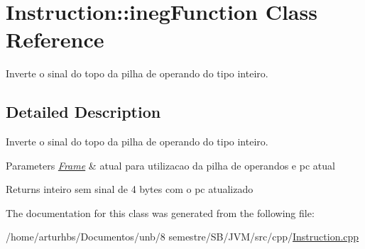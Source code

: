 \hypertarget{classInstruction_1_1inegFunction}{}\section{Instruction\+:\+:ineg\+Function Class Reference}
\label{classInstruction_1_1inegFunction}


Inverte o sinal do topo da pilha de operando do tipo inteiro.  




\subsection{Detailed Description}
Inverte o sinal do topo da pilha de operando do tipo inteiro. 


\begin{DoxyParams}{Parameters}
{\em \hyperlink{classFrame}{Frame}} & atual para utilizacao da pilha de operandos e pc atual \\
\hline
\end{DoxyParams}
\begin{DoxyReturn}{Returns}
inteiro sem sinal de 4 bytes com o pc atualizado 
\end{DoxyReturn}


The documentation for this class was generated from the following file\+:\begin{DoxyCompactItemize}
\item 
/home/arturhbs/\+Documentos/unb/8 semestre/\+S\+B/\+J\+V\+M/src/cpp/\hyperlink{Instruction_8cpp}{Instruction.\+cpp}\end{DoxyCompactItemize}
